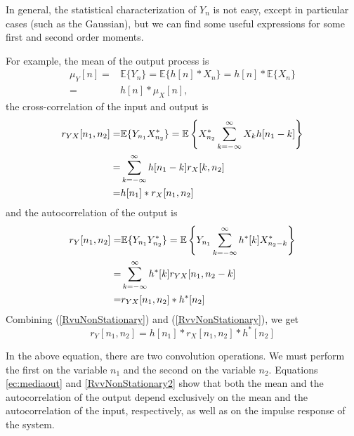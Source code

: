 In general, the statistical characterization of $Y_n$ is not easy, except in particular cases (such as the Gaussian), but we can find some useful expressions for some first and second order moments.

For example, the mean of the output process is
\begin{align}
\mu_Y[n] 
	=& \mathbb{E}\{Y_n\} = \mathbb{E}\{h[n] \ast X_n\}
    =  h[n]*\mathbb{E}\{X_n\}                                    \nonumber\\
    =& h[n]*\mu_X[n],
\label{ec:mediaout}
\end{align}
the cross-correlation of the input and output is
\begin{align}
r_{YX}[n_1,n_2] 
	=& \mathbb{E}\{Y_{n_1} X_{n_2}^*\}
  	= \mathbb{E}\left\{X_{n_2}^* \sum_{k=-\infty}^{\infty} X_k h[n_1-k] \right\} \nonumber \\
    =& \sum_{k=-\infty}^{\infty} h[n_1-k] r_X[k, n_2] \nonumber \\
    =& h[n_1] \ast r_X[n_1, n_2]
\label{RvuNonStationary}
\end{align}
and the autocorrelation of the output is
\begin{align}
r_{Y}[n_1, n_2] 
   =& \mathbb{E}\{Y_{n_1} Y_{n_2}^* \}
   =  \mathbb{E}\left\{Y_{n_1} \sum_{k=-\infty}^{\infty} h^*[k] X_{n_2-k}^* \right\} \nonumber\\
   =& \sum_{k=-\infty}^{\infty} h^*[k] r_{YX}[n_1, n_2 - k]                 \nonumber\\
   =& r_{YX}[n_1, n_2] \ast h^*[n_2]
  \label{RvvNonStationary}
\end{align}
Combining (\ref{RvuNonStationary}) and (\ref{RvvNonStationary}), we get
\begin{equation}
r_Y[n_1,n_2] = h[n_1]*r_X[n_1, n_2]*h^*[n_2]
\label{RvvNonStationary2}
\end{equation}

In the above equation, there are two convolution operations. We must perform the first on the variable $n_1$ and the second on the variable $n_2$. Equations \eqref{ec:mediaout} and \eqref{RvvNonStationary2} show that both the mean and the autocorrelation of the output depend exclusively on the mean and the autocorrelation of the input, respectively, as well as on the impulse response of the system.



